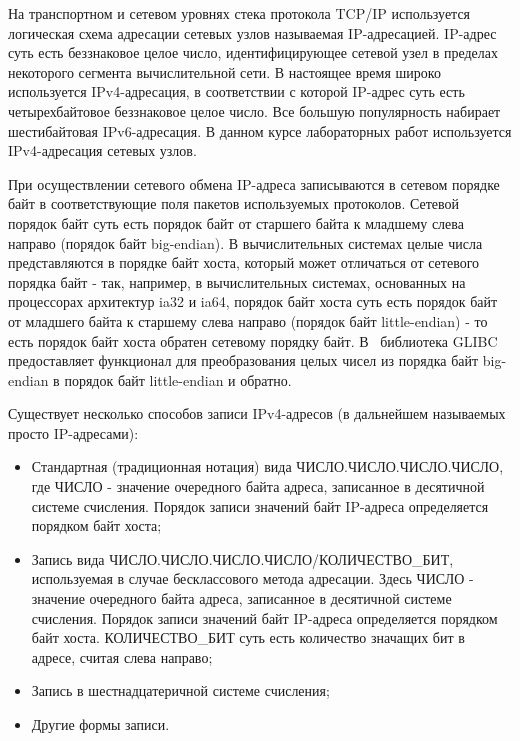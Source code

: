 	На транспортном и сетевом уровнях стека протокола TCP/IP используется логическая схема адресации сетевых узлов называемая
	IP-адресацией. IP-адрес суть есть беззнаковое целое число, идентифицирующее сетевой узел
	в пределах некоторого сегмента вычислительной сети. В настоящее время широко используется IPv4-адресация,
	в соответствии с которой IP-адрес суть есть четырехбайтовое беззнаковое целое число. Все большую популярность
	набирает шестибайтовая IPv6-адресация. В данном курсе лабораторных работ используется IPv4-адресация сетевых узлов.

	При осуществлении сетевого обмена IP-адреса записываются в сетевом порядке байт в соответствующие поля пакетов используемых протоколов.
	Сетевой порядок байт суть есть порядок байт от старшего байта к младшему слева направо (порядок байт big-endian).
	В вычислительных системах целые числа представляются в порядке байт хоста, который может отличаться от сетевого порядка байт -
	так, например, в вычислительных системах, основанных на процессорах архитектур ia32 и ia64, порядок байт хоста суть есть
	порядок байт от младшего байта к старшему слева направо (порядок байт little-endian) - то есть порядок байт хоста обратен сетевому порядку байт.
	В \linux\ библиотека GLIBC предоставляет функционал для преобразования целых чисел из порядка байт big-endian в порядок байт little-endian и обратно.

	Существует несколько способов записи IPv4-адресов (в дальнейшем называемых просто IP-адресами):

	\begin{itemize}

		\item Стандартная (традиционная нотация) вида ЧИСЛО.ЧИСЛО.ЧИСЛО.ЧИСЛО, где ЧИСЛО - значение очередного байта адреса,
		записанное в десятичной системе счисления. Порядок записи значений байт IP-адреса определяется порядком байт хоста;

		\item Запись вида ЧИСЛО.ЧИСЛО.ЧИСЛО.ЧИСЛО/КОЛИЧЕСТВО\_БИТ, используемая в случае бесклассового метода адресации.
			Здесь ЧИСЛО - значение очередного байта адреса, записанное в десятичной системе счисления. Порядок записи значений байт IP-адреса определяется
			порядком байт хоста. КОЛИЧЕСТВО\_БИТ суть есть количество значащих бит в адресе, считая слева направо;

		\item Запись в шестнадцатеричной системе счисления;

		\item Другие формы записи.

	\end{itemize}

